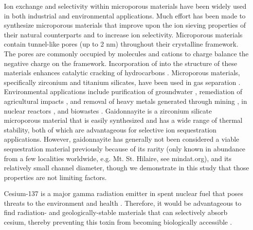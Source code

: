 \documentclass[journal=acsodf,manuscript=article]{achemso}
\begin{document}
Ion exchange and selectivity within microporous materials have been widely used in both industrial and environmental applications. Much effort has been made to synthesize microporous materials that improve upon the ion sieving properties of their natural counterparts and to increase ion selectivity. Microporous materials contain tunnel-like pores (up to 2 nm) throughout their crystalline framework. The pores are commonly occupied by  molecules and cations to charge balance the negative charge on the framework. Incorporation of  into the structure of these materials enhances catalytic cracking of hydrocarbons \cite{Mortensen_2011,Huber_2007,Guisnet_1992,Kramer_1993,Narbeshuber_1995,Kissin_2001}. Microporous materials, specifically zirconium and titanium silicates, have been used in gas separation  \cite{Kuznicki_2001,Marathe_2005,Delgado_2008,Mani_2015,Navascu_s_2006}. Environmental applications include purification of groundwater \cite{Bortun1997}, remediation of agricultural impacts \cite{Mumpton_1999}, and removal of heavy metals generated through mining \cite{motsi2009adsorption}, in nuclear reactors \cite{Mishra2006}, and biowastes \cite{simon2015recovery}. Gaidonnayite is a zirconium silicate microporous material that is easily synthesized and has a wide range of thermal stability, both of which are advantageous for selective ion sequestration applications. However, gaidonnayite has generally not been considered a viable sequestration material previously because of its rarity (only known in abundance from a few localities worldwide, e.g. Mt. St. Hilaire, see mindat.org), and its relatively small channel diameter, though we demonstrate in this study that those properties are not limiting factors.

Cesium-137 is a major gamma radiation emitter in spent nuclear fuel that poses threats to the environment \cite{Galadima2015,Wilmarth2011,Mishra2006,Bortun1997} and health \cite{Redman1972,Ramalho1991,Pinsky1981}. Therefore, it would be advantageous to find radiation- and geologically-stable materials that can selectively absorb cesium, thereby preventing this toxin from becoming biologically accessible \cite{M_ller_2002,Tripathi_2003,Ewing_2004,Hughes_2015,Misaelides2011,Borai_2009,Ewing_2001,Shi_2006}.  
\end{document}

